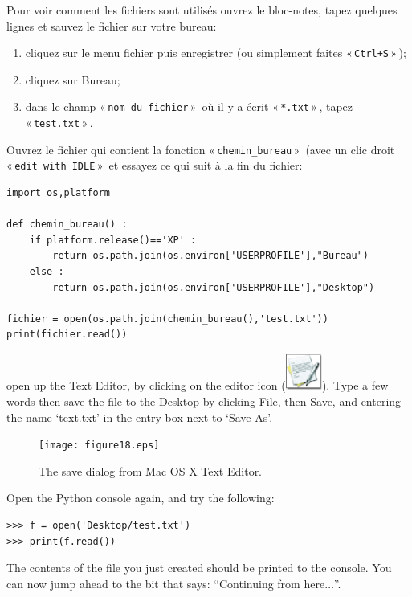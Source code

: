 \begin{MAC}
Pour voir comment les fichiers sont utilisés ouvrez le bloc-notes, tapez quelques lignes et sauvez le fichier sur votre bureau:
\begin{enumerate}
\item cliquez sur le menu fichier puis enregistrer (ou simplement faites « \texttt{Ctrl+S} » );
\item cliquez sur Bureau;
\item dans le champ « \texttt{nom du fichier} »  où il y a écrit « \texttt{*.txt} » , tapez « \texttt{test.txt} » .
\end{enumerate}

Ouvrez le fichier qui contient la fonction « \texttt{chemin\_bureau} »  (avec un clic droit « \texttt{edit with IDLE} »  et essayez ce qui suit à la fin du fichier:
\begin{Verbatim}[frame=single,rulecolor=\color{mbleu}, label=à taper]
import os,platform

def chemin_bureau() :
    if platform.release()=='XP' :
        return os.path.join(os.environ['USERPROFILE'],"Bureau")
    else :
        return os.path.join(os.environ['USERPROFILE'],"Desktop")
    
fichier = open(os.path.join(chemin_bureau(),'test.txt'))
print(fichier.read())
\end{Verbatim}


 open up the Text Editor, by clicking on the editor icon (\includegraphics*[width=12mm]{textedit-icon.eps}).  Type a few words then save the file to the Desktop by clicking File, then Save, and entering the name `text.txt' in the entry box next to `Save As'.

\begin{figure}
\begin{center}
\texttt{[image: figure18.eps]}
\end{center}
\caption{The save dialog from Mac OS X Text Editor.}\label{fig18}
\end{figure}

Open the Python console again, and try the following:

\begin{listing}
\begin{verbatim}
>>> f = open('Desktop/test.txt')
>>> print(f.read())
\end{verbatim}
\end{listing}

The contents of the file you just created should be printed to the console.  You can now jump ahead to the bit that says: ``Continuing from here$\ldots$''.
\end{MAC}

